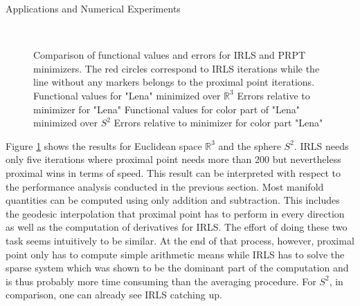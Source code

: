 \begin{chapter}{Applications and Numerical Experiments}
\begin{figure}[h!]
{    }\\
    \caption[Comparison IRLS \& PRPT for Euclidean $\mathbb{R}^3$ and $S^2$]{Comparison of functional values and errors for IRLS and PRPT minimizers.
	The red circles correspond to IRLS iterations while the line without any markers belongs to the proximal point iterations.
	 Functional values for "Lena" minimized over $\mathbb{R}^3$
	 Errors relative to minimizer for "Lena"
	 Functional values for color part of "Lena" minimized over $S^2$
	 Errors relative to minimizer for color part "Lena"
	\label{fig:comparison_euc_s2}
    }
\end{figure}

Figure \ref{fig:comparison_euc_s2} shows the results for Euclidean space $\mathbb{R}^3$ and the sphere $S^2$. IRLS needs only five iterations where proximal point needs more than 200
but nevertheless proximal wins in terms of speed. This result can be interpreted with respect to the performance analysis conducted in the previous section. Most manifold quantities can
be computed using only addition and subtraction. This includes the geodesic interpolation that proximal point has to perform in every direction as well as the computation of derivatives
for IRLS. The effort of doing these two task seems intuitively to be similar. At the end of that process, however, proximal point only has to compute simple arithmetic means while IRLS has to 
solve the sparse system which was shown to be the dominant part of the computation and is thus probably more time consuming than the averaging procedure. For $S^2$, in comparison, one
can already see IRLS catching up.\\


\end{chapter}
